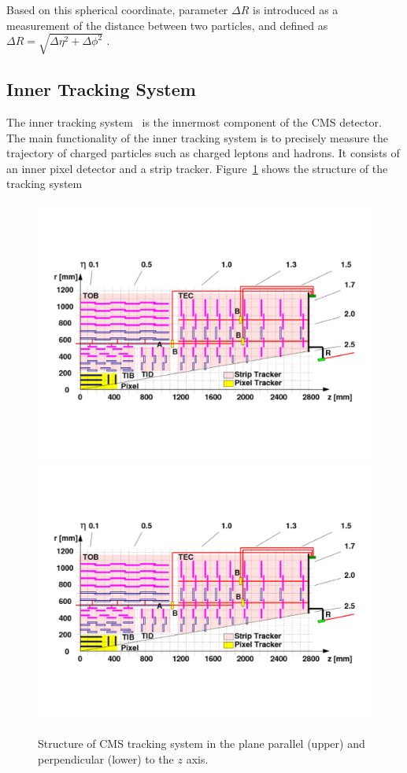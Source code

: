 \vspace{0.3cm}
Based on this spherical coordinate, parameter $\Delta R$ is introduced as a measurement of the distance between two particles, and defined as $\Delta R=\sqrt{\Delta\eta^2 + \Delta\phi^2}$
.
\subsection{Inner Tracking System} 
The inner tracking system~\cite{lhc_trackerdesign} is the innermost component of the CMS detector. The main functionality of the inner tracking system is to precisely measure the trajectory of charged particles such as charged leptons and hadrons. It consists of an inner pixel detector and a strip tracker. Figure~\ref{fig:lhc_trackerbarrel} shows the structure of the tracking system
\begin{figure}[htbp]
\begin{center}
\includegraphics[width=0.7\linewidth, page=1]{figures/lhc_trackerbarrel.pdf}
\includegraphics[width=0.7\linewidth, page=2]{figures/lhc_trackerbarrel.pdf}
\caption{Structure of CMS tracking system in the plane parallel (upper) and perpendicular (lower) to the $z$ axis.}
\label{fig:lhc_trackerbarrel}
\end{center}
\end{figure}


